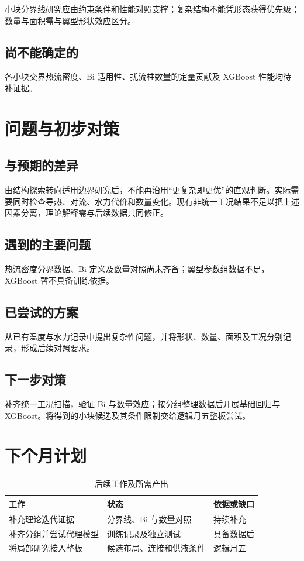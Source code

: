 \documentclass[stage2,fontset=fandol]{ydzjreport}
\begin{document}
小块分界线研究应由约束条件和性能对照支撑；复杂结构不能凭形态获得优先级；数量与面积需与翼型形状效应区分。

\subsection{尚不能确定的}

各小块交界热流密度、Bi 适用性、扰流柱数量的定量贡献及 XGBoost 性能均待补证据。

\section{问题与初步对策}

\subsection{与预期的差异}

由结构探索转向适用边界研究后，不能再沿用“更复杂即更优”的直观判断。实际需要同时检查导热、对流、水力代价和数量变化。现有非统一工况结果不足以把上述因素分离，理论解释需与后续数据共同修正。



\subsection{遇到的主要问题}

热流密度分界数据、Bi 定义及数量对照尚未齐备；翼型参数组数据不足，XGBoost 暂不具备训练依据。

\subsection{已尝试的方案}

从已有温度与水力记录中提出复杂性问题，并将形状、数量、面积及工况分别记录，形成后续对照要求。

\subsection{下一步对策}

补齐统一工况扫描，验证 Bi 与数量效应；按分组整理数据后开展基础回归与 XGBoost。将得到的小块候选及其条件限制交给逻辑月五整板尝试。

\section{下个月计划}

\begin{table}[H]\centering
\caption{后续工作及所需产出}\label{tab:plan}
\begin{tabularx}{\textwidth}{@{}Y Y Y@{}}
\toprule
{} 工作 & 状态 & 依据或缺口 \\
\midrule
补充理论迭代证据 & 分界线、Bi 与数量对照 & 持续补充 \\
补齐分组并尝试代理模型 & 训练记录及独立测试 & 具备数据后 \\
将局部研究接入整板 & 候选布局、连接和供液条件 & 逻辑月五 \\
\bottomrule\end{tabularx}\end{table}
\end{document}
